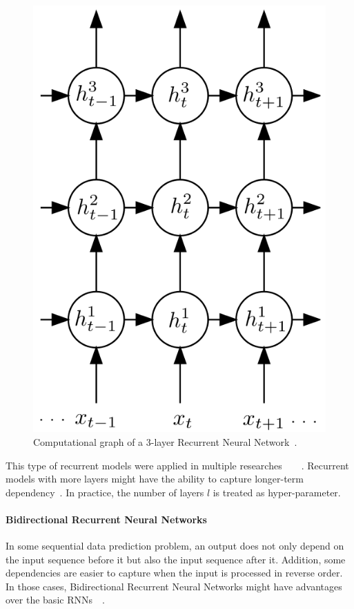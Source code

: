 \begin{figure}[H]
    \centering
    \includegraphics[scale=0.4]{figure/3-layer-lstm}
    \caption{Computational graph of a 3-layer Recurrent Neural Network~\cite{GravesLSTM}.}
    \label{fig:3-layer-lstm}
\end{figure}

This type of recurrent models were applied in multiple researches~\cite{GravesLSTM}~\cite{SutskeverVL14}~\cite{ZarembaS14}~\cite{treeLSTM}.
Recurrent models with more layers might have the ability to capture longer-term dependency~\cite{treeLSTM}.
In practice, the number of layers \(l\) is treated as hyper-parameter.

\paragraph{Bidirectional Recurrent Neural Networks}\label{sec:bilstm}
In some sequential data prediction problem, an output does not only depend on the input sequence before it but also the input sequence after it. 
Addition, some dependencies are easier to capture when the input is processed in reverse order.
In those cases, Bidirectional Recurrent Neural Networks might have advantages over the basic RNNs~\cite{GravesLSTM}~\cite{Graves-thesis}.

